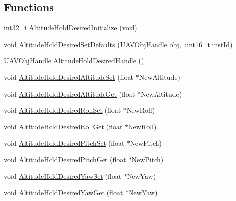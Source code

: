 \subsection*{\-Functions}
\begin{DoxyCompactItemize}
\item 
int32\-\_\-t \hyperlink{group___altitude_hold_desired_ga87fa97eb253c09103978fac1cd458467}{\-Altitude\-Hold\-Desired\-Initialize} (void)
\item 
void \hyperlink{group___altitude_hold_desired_gaee952e050754a98f3fe9d800bc66f05a}{\-Altitude\-Hold\-Desired\-Set\-Defaults} (\hyperlink{targets_2_u_a_v_objects_2inc_2uavobjectmanager_8h_a279053e22be53ce9f895043aaeb91e3b}{\-U\-A\-V\-Obj\-Handle} obj, uint16\-\_\-t inst\-Id)
\item 
\hyperlink{targets_2_u_a_v_objects_2inc_2uavobjectmanager_8h_a279053e22be53ce9f895043aaeb91e3b}{\-U\-A\-V\-Obj\-Handle} \hyperlink{group___altitude_hold_desired_ga629e47dd1c598f61e39c113c55a10d45}{\-Altitude\-Hold\-Desired\-Handle} ()
\item 
void \hyperlink{group___altitude_hold_desired_gab35e200f70c25c21fff3fc2d60fe4bb6}{\-Altitude\-Hold\-Desired\-Altitude\-Set} (float $\ast$\-New\-Altitude)
\item 
void \hyperlink{group___altitude_hold_desired_ga389e906ac9885a8932373a10569ff43d}{\-Altitude\-Hold\-Desired\-Altitude\-Get} (float $\ast$\-New\-Altitude)
\item 
void \hyperlink{group___altitude_hold_desired_ga33b471eeade49578d3eadceb92add9fd}{\-Altitude\-Hold\-Desired\-Roll\-Set} (float $\ast$\-New\-Roll)
\item 
void \hyperlink{group___altitude_hold_desired_ga7d4a7f3fb1013a8cf83d114ed7b4e626}{\-Altitude\-Hold\-Desired\-Roll\-Get} (float $\ast$\-New\-Roll)
\item 
void \hyperlink{group___altitude_hold_desired_ga924400ee2c7871cd5a3006b897eb2cc9}{\-Altitude\-Hold\-Desired\-Pitch\-Set} (float $\ast$\-New\-Pitch)
\item 
void \hyperlink{group___altitude_hold_desired_gaac0e7bf1bd6e3f3c17d3856f39471d2b}{\-Altitude\-Hold\-Desired\-Pitch\-Get} (float $\ast$\-New\-Pitch)
\item 
void \hyperlink{group___altitude_hold_desired_ga03cf7d17035100eeb8ef1b8017df21ff}{\-Altitude\-Hold\-Desired\-Yaw\-Set} (float $\ast$\-New\-Yaw)
\item 
void \hyperlink{group___altitude_hold_desired_gabf83eea8ca046891ce677e8f6878b44c}{\-Altitude\-Hold\-Desired\-Yaw\-Get} (float $\ast$\-New\-Yaw)
\end{DoxyCompactItemize}



